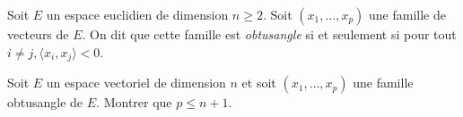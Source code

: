 \begin{defi}
    Soit $E$ un espace euclidien de dimension $n \geqslant 2$. Soit $(x_1, \dots, x_p)$ une famille de vecteurs de $E$. On dit que cette famille est \emph{obtusangle} si et seulement si pour tout $i \not= j, \langle x_i, x_j \rangle < 0$. 
\end{defi}

\begin{exercice0}
    Soit $E$ un espace vectoriel de dimension $n$ et soit $(x_1, \dots, x_p)$ une famille obtusangle de $E$. Montrer que $p \leqslant n + 1$. 
\end{exercice0}
